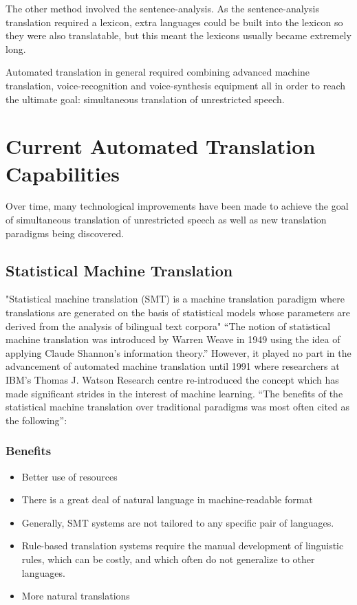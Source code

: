 \documentclass[12pt,a4paper]{article}
\begin{document}
The other method involved the sentence-analysis. As the sentence-analysis translation required a lexicon, extra languages could be built into the lexicon so they were also translatable, but this meant the lexicons usually became extremely long. 

Automated translation in general required combining advanced machine translation, voice-recognition and voice-synthesis equipment all in order to reach the ultimate goal: simultaneous translation of unrestricted speech.


\section{Current Automated Translation Capabilities}
Over time, many technological improvements have been made to achieve the goal of simultaneous
translation of unrestricted speech as well as new translation paradigms being discovered. 

\subsection{Statistical Machine Translation}
"Statistical machine translation (SMT) is a machine translation paradigm where translations are generated on the basis of statistical models whose parameters are derived from the analysis of bilingual text corpora\footnotemark[4]"\cite{SMT Wikipedia}
“The notion of statistical machine translation was introduced by Warren Weave in 1949 using the idea of applying Claude Shannon’s information theory.”\cite{SMT Wikipedia} However, it played no part in the advancement of automated machine translation until 1991 where researchers at IBM’s Thomas J. Watson Research centre re-introduced the concept which has made significant strides in the interest of machine learning. “The benefits of the statistical machine translation over traditional paradigms was most often cited as the following”\cite{SMT Wikipedia}:
\newpage 
\subsubsection{Benefits}
\begin{itemize}
\item Better use of resources
\item There is a great deal of natural language in machine-readable format
\item Generally, SMT systems are not tailored to any specific pair of languages.
\item Rule-based translation systems require the manual development of linguistic rules, which can be costly, and which often do not generalize to other languages.
\item More natural translations
\end{itemize}
\end{document}
